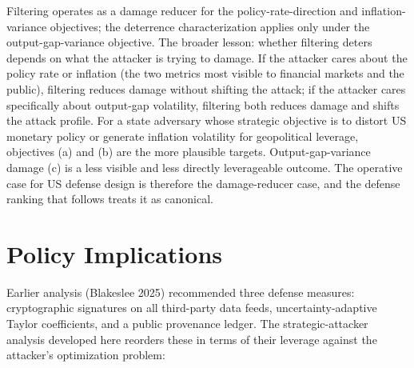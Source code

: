 \documentclass[12pt]{article}
\begin{document}
Filtering operates as a damage reducer for the policy-rate-direction and inflation-variance objectives; the deterrence characterization applies only under the output-gap-variance objective. The broader lesson: whether filtering deters depends on what the attacker is trying to damage. If the attacker cares about the policy rate or inflation (the two metrics most visible to financial markets and the public), filtering reduces damage without shifting the attack; if the attacker cares specifically about output-gap volatility, filtering both reduces damage and shifts the attack profile. For a state adversary whose strategic objective is to distort US monetary policy or generate inflation volatility for geopolitical leverage, objectives (a) and (b) are the more plausible targets. Output-gap-variance damage (c) is a less visible and less directly leverageable outcome. The operative case for US defense design is therefore the damage-reducer case, and the defense ranking that follows treats it as canonical.

\section{Policy Implications}\label{sec:policy}

Earlier analysis (Blakeslee 2025) recommended three defense measures: cryptographic signatures on all third-party data feeds, uncertainty-adaptive Taylor coefficients, and a public provenance ledger. The strategic-attacker analysis developed here reorders these in terms of their leverage against the attacker's optimization problem:
\end{document}
